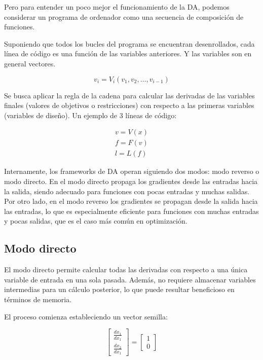 Pero para entender un poco mejor el funcionamiento de la DA, podemos considerar
un programa de ordenador como una secuencia de composición de funciones.

Suponiendo que todos los bucles del programa se encuentran desenrollados, cada
línea de código es una función de las variables anteriores. Y las variables son
en general vectores.

\begin{equation}
	v_i = V_i(v_1, v_2, \ldots, v_{i-1})
\end{equation}

Se busca aplicar la regla de la cadena para calcular las derivadas de las
variables finales (valores de objetivos o restricciones) con respecto a las
primeras variables (variables de diseño). Un ejemplo de 3 líneas de código:

\begin{align}
	v = V(x) \label{eq:ad_example_first_eq}  \\
	f = F(v) \label{eq:ad_example_second_eq} \\
	l = L(f) \label{eq:ad_example_third_eq}
\end{align}

Internamente, los frameworks de DA operan siguiendo dos modos: modo reverso o
modo directo. En el modo directo propaga los gradientes desde las entradas
hacia la salida, siendo adecuado para funciones con pocas entradas y muchas
salidas. Por otro lado, en el modo reverso los gradientes se propagan desde la
salida hacia las entradas, lo que es especialmente eficiente para funciones con
muchas entradas y pocas salidas, que es el caso más común en optimización.


\subsection{Modo directo}

El modo directo permite calcular todas las derivadas con respecto a una única
variable de entrada en una sola pasada. Además, no requiere almacenar variables
intermedias para un cálculo posterior, lo que puede resultar beneficioso en
términos de memoria.

El proceso comienza estableciendo un vector semilla:

\begin{equation} \label{eq:direct_seed}
	\begin{bmatrix}
		\frac{dx_1}{dx_1} \\
		\frac{dx_2}{dx_1}
	\end{bmatrix}
	=
	\begin{bmatrix}
		1 \\
		0
	\end{bmatrix}
\end{equation}

